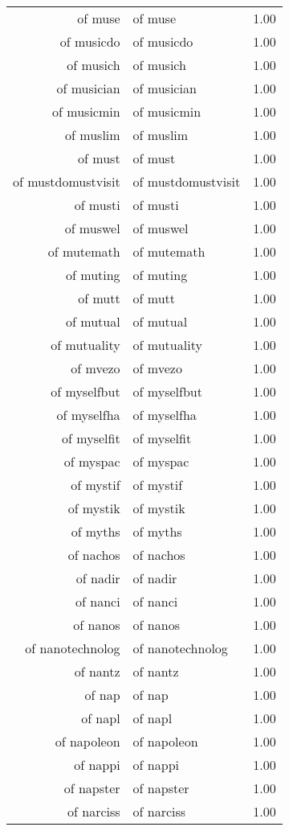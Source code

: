 \begin{table}[ht]
\begin{tabular}{rlr}
  of muse & of muse & 1.00 \\ 
  of musicdo & of musicdo & 1.00 \\ 
  of musich & of musich & 1.00 \\ 
  of musician & of musician & 1.00 \\ 
  of musicmin & of musicmin & 1.00 \\ 
  of muslim & of muslim & 1.00 \\ 
  of must & of must & 1.00 \\ 
  of mustdomustvisit & of mustdomustvisit & 1.00 \\ 
  of musti & of musti & 1.00 \\ 
  of muswel & of muswel & 1.00 \\ 
  of mutemath & of mutemath & 1.00 \\ 
  of muting & of muting & 1.00 \\ 
  of mutt & of mutt & 1.00 \\ 
  of mutual & of mutual & 1.00 \\ 
  of mutuality & of mutuality & 1.00 \\ 
  of mvezo & of mvezo & 1.00 \\ 
  of myselfbut & of myselfbut & 1.00 \\ 
  of myselfha & of myselfha & 1.00 \\ 
  of myselfit & of myselfit & 1.00 \\ 
  of myspac & of myspac & 1.00 \\ 
  of mystif & of mystif & 1.00 \\ 
  of mystik & of mystik & 1.00 \\ 
  of myths & of myths & 1.00 \\ 
  of nachos & of nachos & 1.00 \\ 
  of nadir & of nadir & 1.00 \\ 
  of nanci & of nanci & 1.00 \\ 
  of nanos & of nanos & 1.00 \\ 
  of nanotechnolog & of nanotechnolog & 1.00 \\ 
  of nantz & of nantz & 1.00 \\ 
  of nap & of nap & 1.00 \\ 
  of napl & of napl & 1.00 \\ 
  of napoleon & of napoleon & 1.00 \\ 
  of nappi & of nappi & 1.00 \\ 
  of napster & of napster & 1.00 \\ 
  of narciss & of narciss & 1.00 \\ 

\end{tabular}
\end{table}
